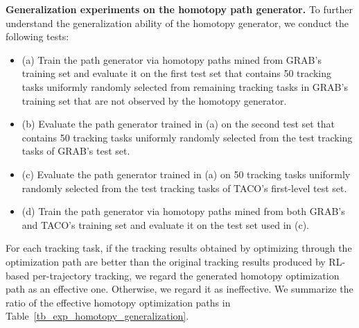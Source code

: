 \begin{table*}[t]
    \centering
    \caption{ 
    \textcolor{myblue}{Generalization experiments on the homotopy path generator. }
    } 
    \label{tb_exp_homotopy_generalization}
\end{table*}

\textcolor{myblue}{
\noindent\textbf{Generalization experiments on the homotopy path generator.}
To further understand the generalization ability of the homotopy generator, we conduct the following tests: 
\begin{itemize}
    \item (a) Train the path generator via homotopy paths mined from GRAB's training set and evaluate it on the first test set that contains 50 tracking tasks uniformly randomly selected from remaining tracking tasks in GRAB's training set that are not observed by the homotopy generator. 
    \item (b) Evaluate the path generator trained in (a) on the second test set that contains 50 tracking tasks uniformly randomly selected from the test tracking tasks of GRAB's test set. 
    \item (c) Evaluate the path generator trained in (a) on 50 tracking tasks uniformly randomly selected from the test tracking tasks of TACO's first-level test set. 
    \item (d) Train the path generator via homotopy paths mined from both GRAB's and TACO's training set and evaluate it on the test set used in (c). 
\end{itemize}
For each tracking task, if the tracking results obtained by optimizing through the optimization path are better than the original tracking results produced by RL-based per-trajectory tracking, we regard the generated homotopy optimization path as an effective one. Otherwise, we regard it as ineffective. We summarize the ratio of the effective homotopy optimization paths in Table~\ref{tb_exp_homotopy_generalization}. 
}

